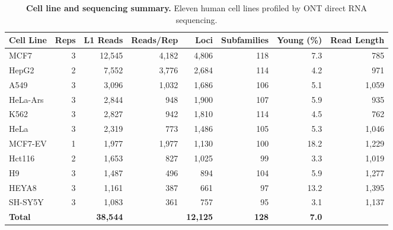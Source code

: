\documentclass[11pt]{article}
\begin{document}
\begin{table}[htbp]
\centering
\caption{\textbf{Cell line and sequencing summary.} Eleven human cell lines profiled by ONT direct RNA sequencing.}
\label{tab:s1}
\begin{tabular}{lrrrrrrr}
\toprule
Cell Line & Reps & L1 Reads & Reads/Rep & Loci & Subfamilies & Young (\%) & Read Length \\
\midrule
MCF7     & 3 & 12{,}545 & 4{,}182 & 4{,}806 & 118 &  7.3 &  785 \\
HepG2    & 2 &  7{,}552 & 3{,}776 & 2{,}684 & 114 &  4.2 &  971 \\
A549     & 3 &  3{,}096 & 1{,}032 & 1{,}686 & 106 &  5.1 & 1{,}059 \\
HeLa-Ars & 3 &  2{,}844 &    948 & 1{,}900 & 107 &  5.9 &  935 \\
K562     & 3 &  2{,}827 &    942 & 1{,}810 & 114 &  4.5 &  762 \\
HeLa     & 3 &  2{,}319 &    773 & 1{,}486 & 105 &  5.3 & 1{,}046 \\
MCF7-EV  & 1 &  1{,}977 & 1{,}977 & 1{,}130 & 100 & 18.2 & 1{,}229 \\
Hct116   & 2 &  1{,}653 &    827 & 1{,}025 &  99 &  3.3 & 1{,}019 \\
H9       & 3 &  1{,}487 &    496 &    894 & 104 &  5.9 & 1{,}277 \\
HEYA8    & 3 &  1{,}161 &    387 &    661 &  97 & 13.2 & 1{,}395 \\
SH-SY5Y  & 3 &  1{,}083 &    361 &    757 &  95 &  3.1 & 1{,}137 \\
\midrule
\textbf{Total} & & \textbf{38{,}544} & & \textbf{12{,}125} & \textbf{128} & \textbf{7.0} & \\
\bottomrule
\end{tabular}
\end{table}
\end{document}
